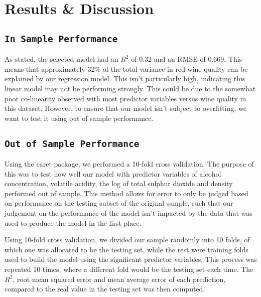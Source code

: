 \documentclass[letterpaper,8pt,twocolumn,twoside,]{pinp}
\begin{document}
\hypertarget{results-discussion}{%
\section{Results \& Discussion}\label{results-discussion}}

\hypertarget{in-sample-performance}{%
\subsection{\texorpdfstring{\texttt{In\ Sample\ Performance}}{In Sample Performance}}\label{in-sample-performance}}

As stated, the selected model had an \(R^2\) of 0.32 and an RMSE of
0.669. This means that approximately 32\% of the total variance in red
wine quality can be explained by our regression model. This isn't
particularly high, indicating this linear model may not be performing
strongly. This could be due to the somewhat poor co-linearity observed
with most predictor variables versus wine quality in this dataset.
However, to ensure that our model isn't subject to overfitting, we want
to test it using out of sample performance.

\hypertarget{out-of-sample-performance}{%
\subsection{\texorpdfstring{\texttt{Out\ of\ Sample\ Performance}}{Out of Sample Performance}}\label{out-of-sample-performance}}

Using the caret package, we performed a 10-fold cross validation. The
purpose of this was to test how well our model with predictor variables
of alcohol concentration, volatile acidity, the log of total sulphur
dioxide and density performed out of sample. This method allows for
error to only be judged based on performance on the testing subset of
the original sample, such that our judgement on the performance of the
model isn't impacted by the data that was used to produce the model in
the first place.

Using 10-fold cross validation, we divided our sample randomly into 10
folds, of which one was allocated to be the testing set, while the rest
were training folds used to build the model using the significant
predictor variables. This process was repeated 10 times, where a
different fold would be the testing set each time. The \(R^2\), root
mean squared error and mean average error of each prediction, compared
to the real value in the testing set was then computed.
\end{document}
